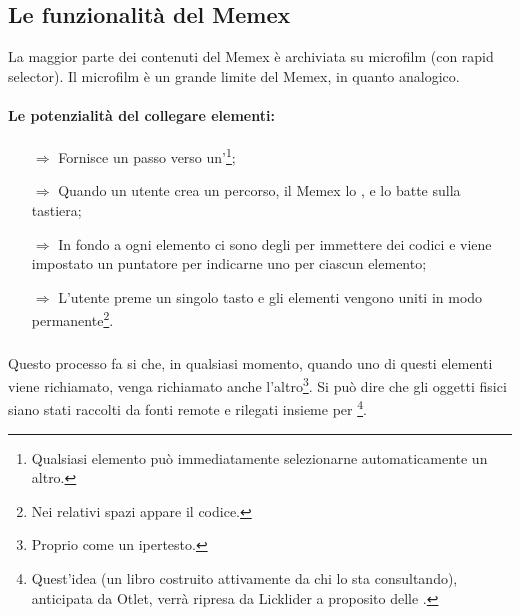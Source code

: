 
\subsection{Le funzionalità del Memex}

La maggior parte dei contenuti del Memex è archiviata su microfilm (con rapid selector).
Il microfilm è un grande limite del Memex, in quanto analogico.

\paragraph{Le potenzialità del collegare elementi:}

\begin{itemize}
    \item [$\Rightarrow$] Fornisce un passo verso un'\footnote{Qualsiasi elemento può immediatamente selezionarne automaticamente un altro.};
    \item [$\Rightarrow$] Quando un utente crea un percorso, il Memex lo ,
     e lo batte sulla tastiera;
    \item [$\Rightarrow$] In fondo a ogni elemento ci sono degli  per immettere dei codici e viene impostato un puntatore per indicarne uno per ciascun elemento;
    \item [$\Rightarrow$] L'utente preme un singolo tasto e gli elementi vengono uniti in modo permanente\footnote{Nei relativi spazi appare il codice.}.
\end{itemize}

\subsubsection{}
Questo processo fa si che, in qualsiasi momento, quando uno di questi elementi
viene richiamato, venga richiamato anche l'altro\footnote{Proprio come un ipertesto.}.
Si può dire che gli oggetti fisici siano stati raccolti da fonti remote e rilegati
insieme per \footnote{
    Quest'idea (un libro costruito attivamente da chi lo sta consultando), anticipata da Otlet,
    verrà ripresa da Licklider a proposito delle .
}.


